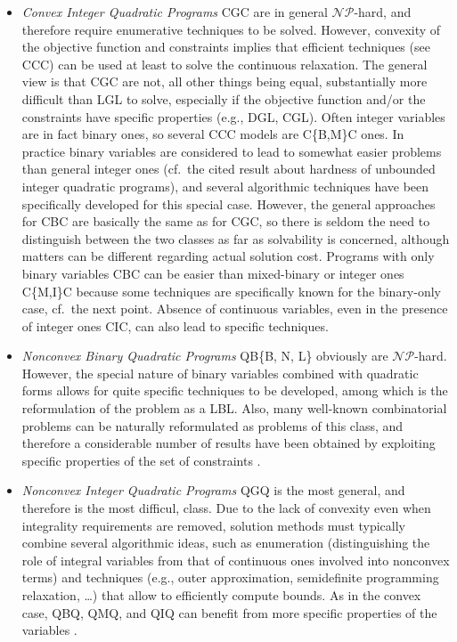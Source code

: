 \begin{itemize}
 \item \emph{Convex Integer Quadratic Programs} CGC are in general $\mathcal{NP}$-hard, and therefore require enumerative techniques to be solved. However, convexity of the objective function and constraints implies that efficient techniques (see CCC) can be used at least to solve the continuous relaxation. The general view is that CGC are not, all other things being equal,  substantially more difficult than LGL to solve, especially if the objective function and/or the constraints have specific properties (e.g., DGL, CGL). Often integer variables are in fact binary ones, so several CCC models are C\{B,M\}C ones. In practice binary variables are considered to lead to somewhat easier problems than general integer ones (cf.~the cited result about hardness of unbounded integer quadratic programs), and several algorithmic techniques have been specifically developed for this special case. However, the general approaches for CBC are basically the same as for CGC, so there is seldom the need to distinguish between the two classes as far as solvability is concerned, although matters can be different regarding actual solution cost. Programs with only binary variables CBC can be easier than mixed-binary or integer ones C\{M,I\}C because some techniques are specifically known for the binary-only case, cf.~the next point. Absence of continuous variables, even in the presence of integer ones CIC, can also lead to specific techniques.
  \item \emph{Nonconvex Binary Quadratic Programs} QB\{B, N, L\} obviously are $\mathcal{NP}$-hard. However, the special nature of binary variables combined with quadratic forms allows for quite specific techniques to be developed, among which is the reformulation of the problem as a LBL. Also, many well-known combinatorial problems can be naturally reformulated as problems of this class, and therefore a considerable number of results have been obtained by exploiting specific properties of the set of constraints \cite{Rendl2008}.
  \item \emph{Nonconvex Integer Quadratic Programs} QGQ is the most general, and therefore is the most difficul, class. Due to the lack of convexity even when integrality requirements are removed, solution methods must typically combine several algorithmic ideas, such as enumeration (distinguishing the role of integral variables from that of continuous ones involved into nonconvex terms) and techniques (e.g., outer approximation, semidefinite programming relaxation, \ldots) that allow to efficiently compute bounds. As in the convex case, QBQ, QMQ, and QIQ can benefit from more specific properties of the variables \cite{Buchheim2013,Dong2016}.
\end{itemize}
